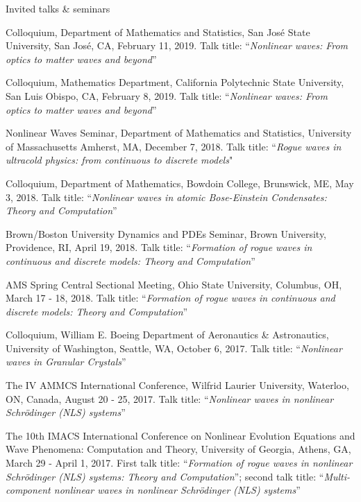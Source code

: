 \documentclass[10pt]{article} %
\newenvironment{innerlist}[1][\enskip\textbullet]%
        {\begin{compactitem}[#1]}{\end{compactitem}}
\begin{document}
\begin{section}{Invited talks \& seminars}
\begin{innerlist}
\item   Colloquium, Department of Mathematics and Statistics, San Jos\'e State University, San Jos\'e, CA, February 11, 2019.
       Talk title: ``\textit{Nonlinear waves: From optics to matter waves and beyond}''
        
\item   Colloquium, Mathematics Department, California Polytechnic State University, San Luis Obispo, CA, February 8, 2019.
       Talk title: ``\textit{Nonlinear waves: From optics to matter waves and beyond}''        
        
\item   Nonlinear Waves Seminar, Department of Mathematics and Statistics, University of Massachusetts Amherst, MA, December 7, 2018.
        Talk title: ``\textit{Rogue waves in ultracold physics: from continuous to discrete models}"        
        
\item   Colloquium, Department of Mathematics, Bowdoin College, Brunswick, ME, May 3, 2018.
        Talk title: ``\textit{Nonlinear waves in atomic Bose-Einstein Condensates: Theory and Computation}''
       
\item   Brown/Boston University Dynamics and PDEs Seminar, Brown University, Providence, RI, April 19, 2018.
        Talk title: ``\textit{Formation of rogue waves in continuous and discrete models: Theory and Computation}''

\item   AMS Spring Central Sectional Meeting, Ohio State University, Columbus, OH, March 17 - 18, 2018.
        Talk title: ``\textit{Formation of rogue waves in continuous and discrete models: Theory and Computation}''                
                     
\item   Colloquium, William E. Boeing Department of Aeronautics \& Astronautics, University of Washington, Seattle, WA, October 6, 2017.
        Talk title: ``\textit{Nonlinear waves in Granular Crystals}''
    
\item   The IV AMMCS International Conference, Wilfrid Laurier University, Waterloo, ON, Canada, August 20 - 25, 2017. 
        Talk title: ``\textit{Nonlinear waves in nonlinear Schr\"odinger (NLS) systems}''

\item   The 10th IMACS International Conference on Nonlinear Evolution Equations and Wave Phenomena: Computation and Theory, %
        University of Georgia, Athens, GA, March 29 - April 1, 2017. 
        First talk title: ``\textit{Formation of rogue waves in nonlinear Schr\"odinger (NLS) systems: Theory and Computation}'';      
        second talk title: ``\textit{Multi-component nonlinear waves in nonlinear Schr\"odinger (NLS) systems}''
         

\end{innerlist}
\end{section}
\end{document}
